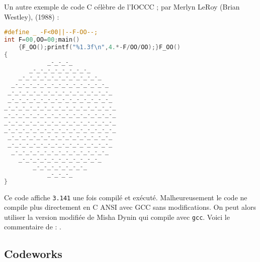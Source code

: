 \documentclass[12pt]{article} %
\begin{document}
\newpage
Un autre exemple de code C célèbre de l'IOCCC ; par Merlyn LeRoy (Brian Westley), (1988) :
\begin{lstlisting}[language=C, caption={Pi circle (westley 1988)}, label={code:pi-circle}]
#define _ -F<00||--F-OO--;
int F=00,OO=00;main()
    {F_OO();printf("%1.3f\n",4.*-F/OO/OO);}F_OO()
{
            _-_-_-_
       _-_-_-_-_-_-_-_-_
    _-_-_-_-_-_-_-_-_-_-_-_
  _-_-_-_-_-_-_-_-_-_-_-_-_-_
 _-_-_-_-_-_-_-_-_-_-_-_-_-_-_
 _-_-_-_-_-_-_-_-_-_-_-_-_-_-_
_-_-_-_-_-_-_-_-_-_-_-_-_-_-_-_
_-_-_-_-_-_-_-_-_-_-_-_-_-_-_-_
_-_-_-_-_-_-_-_-_-_-_-_-_-_-_-_
_-_-_-_-_-_-_-_-_-_-_-_-_-_-_-_
 _-_-_-_-_-_-_-_-_-_-_-_-_-_-_
 _-_-_-_-_-_-_-_-_-_-_-_-_-_-_
  _-_-_-_-_-_-_-_-_-_-_-_-_-_
    _-_-_-_-_-_-_-_-_-_-_-_
        _-_-_-_-_-_-_-_
            _-_-_-_
}
\end{lstlisting}
Ce code affiche \verb|3.141| une fois compilé et exécuté. Malheureusement le code ne compile plus directement en C ANSI avec GCC sans modifications. On peut alors utiliser la version modifiée de Misha Dynin qui compile avec \verb|gcc|. Voici le commentaire de \citeauthor{MEnriqueBermudez-ObfuscatedCCode} :  \cite{MEnriqueBermudez-ObfuscatedCCode}.

\newpage
\subsection{Codeworks}
\end{document}
